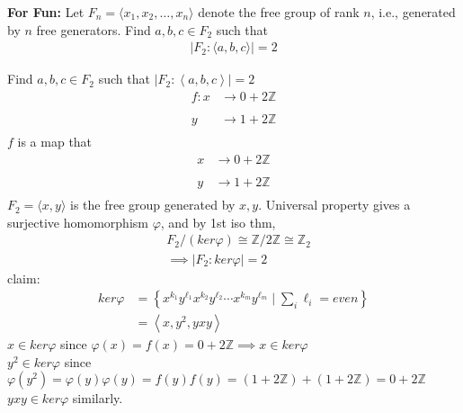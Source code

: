 \documentclass{article}
\begin{document}
\pagebreak

\begin{homeworkProblem}
    \textbf{For Fun:} Let $F_n = \langle x_1, x_2, \ldots, x_n \rangle$
    denote the free group of rank $n$, i.e.,
    generated by $n$ free generators. 
    Find $a,b,c \in F_2$ such that
    \begin{align}
        \lvert F_2 : \langle a, b, c \rangle \rvert = 2
    \end{align}

    \solution

    Find $a,b,c \in F_2 $ such that $\lvert F_2: \left\langle a,b,c \right\rangle \rvert = 2$\\
    \begin{align}
        f: x &\xrightarrow[]{} 0 + 2 \mathbb{Z}\\
        y &\xrightarrow[]{} 1 + 2 \mathbb{Z}
    \end{align}
    $f$ is a map that 
    \begin{align}
        x &\xrightarrow[]{} 0 + 2 \mathbb{Z}\\
        y &\xrightarrow[]{} 1 + 2 \mathbb{Z}
    \end{align}
    $F_2 = \langle x, y \rangle$ is the free group
    generated by $x,y$.
    Universal property gives a surjective homomorphism $\varphi$,
    and by 1st iso thm,
    \begin{align}
        &F_2 / (ker \varphi) \cong \mathbb{Z} / 2 \mathbb{Z} \cong \mathbb{Z}_2\\
        &\implies \lvert F_2 : ker \varphi \rvert = 2
    \end{align}
    claim: 
    \begin{align}
        ker \varphi &= \left\{ x^{k_1} y^{\ell_1} x^{k_2} y^{\ell_2} \cdots x^{k_m} y^{\ell_m} \mid \sum_i \ell_i = even \right\}\\
        &= \left\langle x, y^2, yxy \right\rangle
    \end{align}
    $x \in ker \varphi$ since $\varphi (x) = f(x) = 0 + 2 \mathbb{Z} \implies x \in ker \varphi$ \\
    $ y^2 \in ker \varphi$ since 
    $\varphi (y^2 ) = \varphi(y) \varphi(y) = f(y)f(y) = (1+2 \mathbb{Z}) + (1+ 2 \mathbb{Z}) = 0 + 2 \mathbb{Z}$\\
    $y x y \in ker \varphi$ similarly.\\


    
    
    
    

\end{homeworkProblem}
\end{document}
